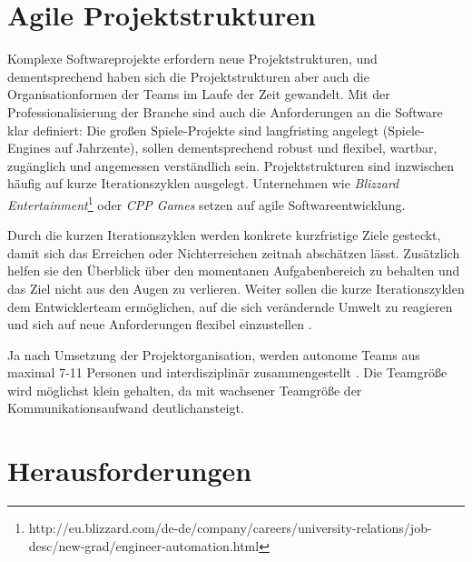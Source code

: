 \section{Agile Projektstrukturen}\label{sec:engines-projektstrukturen}

Komplexe Softwareprojekte erfordern neue Projektstrukturen, und dementsprechend haben sich die Projektstrukturen aber auch die Organisationformen der Teams im Laufe der Zeit gewandelt. Mit der Professionalisierung der Branche sind auch die Anforderungen an die Software klar definiert: Die großen Spiele-Projekte sind langfristing angelegt (Spiele-Engines auf Jahrzente), sollen dementsprechend robust und flexibel, wartbar, zugänglich und angemessen verständlich sein. Projektstrukturen sind inzwischen häufig auf kurze Iterationszyklen ausgelegt. Unternehmen wie \textit{Blizzard Entertainment}\footnote{http://eu.blizzard.com/de-de/company/careers/university-relations/job-desc/new-grad/engineer-automation.html} oder \textit{CPP Games} \parencite[Kapitel 8]{keith2010agile} setzen auf agile Softwareentwicklung.

Durch die kurzen Iterationszyklen werden konkrete kurzfristige Ziele gesteckt, damit sich das Erreichen oder Nichterreichen zeitnah abschätzen lässt. Zusätzlich helfen sie den Überblick über den momentanen Aufgabenbereich zu behalten und das Ziel nicht aus den Augen zu verlieren. Weiter sollen die kurze Iterationszyklen dem Entwicklerteam ermöglichen, auf die sich verändernde Umwelt zu reagieren und sich auf neue Anforderungen flexibel einzustellen \parencite[Kapitel 4]{keith2010agile}.

Ja nach Umsetzung der Projektorganisation, werden autonome Teams aus maximal 7-11 Personen und interdisziplinär zusammengestellt \parencite[Kapitel 8]{keith2010agile}. Die Teamgröße wird möglichst klein gehalten, da mit wachsener Teamgröße der Kommunikationsaufwand deutlich\footnotemark ansteigt.


\section{Herausforderungen}\label{sec:engines-herausforderungen}

